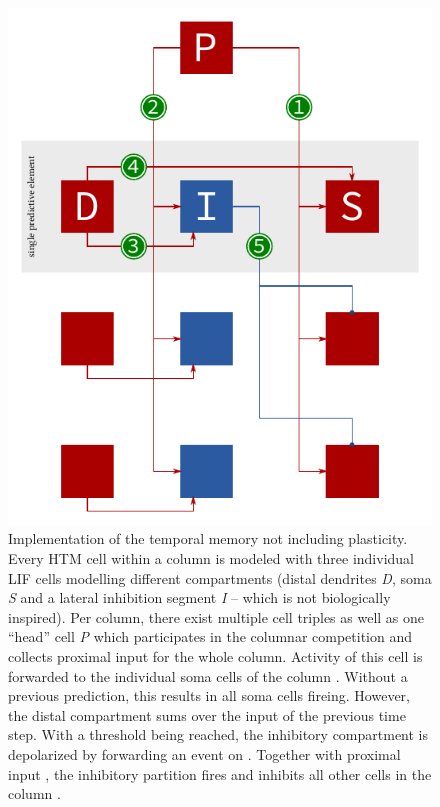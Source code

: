 \begin{figure}
	\begin{center}
		\includegraphics{../circuitry/column.pdf}
	\end{center}
	\caption{Implementation of the temporal memory not including plasticity. Every HTM cell within a column is modeled with three individual LIF cells modelling different compartments (distal dendrites \emph{D}, soma \emph{S} and a lateral inhibition segment \emph{I} -- which is not biologically inspired). Per column, there exist multiple cell triples as well as one ``head'' cell \emph{P} which participates in the columnar competition and collects proximal input for the whole column. Activity of this cell is forwarded to the individual soma cells of the column \protect{}. Without a previous prediction, this results in all soma cells fireing. However, the distal compartment sums over the input of the previous time step. With a threshold being reached, the inhibitory compartment is depolarized by forwarding an event on \protect{}. Together with proximal input \protect{}, the inhibitory partition fires and inhibits all other cells in the column \protect{}.}
	\label{fig:static_temporal_memory}
\end{figure}
